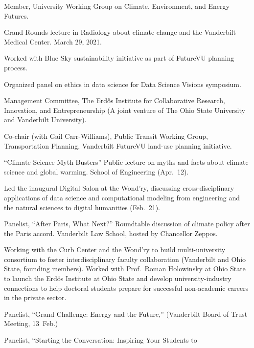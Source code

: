 \item[2021] Member, University Working Group on Climate, Environment, and Energy
  Futures.
\item[2021] Grand Rounds lecture in Radiology about climate change and the
  Vanderbilt Medical Center. March 29, 2021.
\item[2018--2019] Worked with Blue Sky sustainability initiative as part of
  FutureVU planning process.
\item[2018] Organized panel on ethics in data science for Data Science Visions
  symposium.
\item[2017--present] Management Committee, The Erd\H{o}s Institute for
  Collaborative Research, Innovation, and Entrepreneurship (A joint venture of
  The Ohio State University and Vanderbilt University).
\item[2017] Co-chair (with Gail Carr-Williams), Public Transit Working Group,
  Transportation Planning, Vanderbilt FutureVU land-use planning initiative.
\item[2017] ``Climate Science Myth Busters'' Public lecture on myths and facts
  about climate science and global warming. School of Engineering (Apr.~12).
\item[2017] Led the inaugural Digital Salon at the Wond'ry, discussing
  cross-disciplinary applications of data science and computational modeling
  from engineering and the natural sciences to digital humanities (Feb.~21).
\item[2016] Panelist, ``After Paris, What Next?''  Roundtable discussion of
  climate policy after the Paris accord. Vanderbilt Law School, hosted by
  Chancellor Zeppos.
\item[2015--2017] Working with the Curb Center and the Wond'ry to build
  multi-university consortium to foster interdisciplinary faculty collaboration
  (Vanderbilt and Ohio State, founding members).  Worked with Prof.\ Roman
  Holowinsky at Ohio State to launch the Erd\"os Institute at Ohio State and
  develop university-industry connections to help doctoral students prepare for
  successful non-academic careers in the private sector.
\item[2015] Panelist, ``Grand Challenge: Energy and the Future,'' (Vanderbilt
  Board of Trust Meeting, 13~Feb.)
\item[2013] Panelist, ``Starting the Conversation: Inspiring Your Students to
